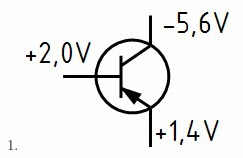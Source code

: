 \documentclass[8pt]{article}
\begin{document}
\begin{enumerate}
\begin{enumerate}[nolistsep,label=\Alph*]
{\begin{enumerate}[nolistsep,label=\Alph*]
\begin{enumerate}[nolistsep,label=\Alph*]
\begin{center}
	\end{center}
\item
	\begin{center}
		\begin{minipage}{\linewidth}
			\centering
			\includegraphics[scale=1.0]{pics/tc616_d.jpg}
		\end{minipage}
	\end{center}
\end{enumerate}


\end{enumerate}}
\end{enumerate}
\end{enumerate}
\end{document}
